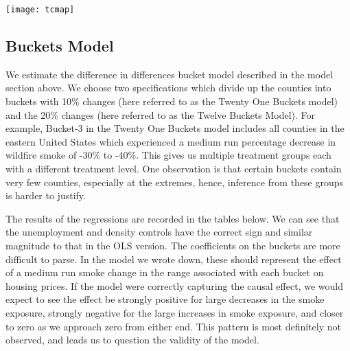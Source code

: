 \documentclass[12pt]{article}
\begin{document}
\texttt{[image: tcmap]}

\subsection{Buckets Model} We estimate the difference in differences bucket model described in the model section above.  We choose two specifications which divide up the counties into buckets with 10\% changes (here referred to as the Twenty One Buckets model) and the 20\% changes (here referred to as the Twelve Buckets Model).  For example, Bucket-3 in the Twenty One Buckets model includes all counties in the eastern United States which experienced a medium run percentage decrease in wildfire smoke of -30\% to -40\%.  This gives us multiple treatment groups each with a different treatment level.  One observation is that certain buckets contain very few counties, especially at the extremes, hence, inference from these groups is harder to justify.  

The results of the regressions are recorded in the tables below.  We can see that the unemployment and density controls have the correct sign and similar magnitude to that in the OLS version.   The coefficients on the buckets are more difficult to parse.  In the model we wrote down, these should represent the effect of a medium run smoke change in the range associated with each bucket on housing prices.  If the model were correctly capturing the causal effect, we would expect to see the effect be strongly positive for large decreases in the smoke exposure, strongly negative for the large increases in smoke exposure, and closer to zero as we approach zero from either end.  This pattern is most definitely not observed, and leads us to question the validity of the model.   
\end{document}
